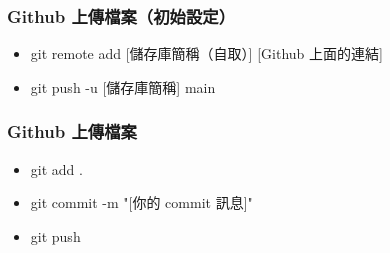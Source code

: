 \documentclass[mathserif]{beamer}
\begin{document}
\begin{frame}
    \frametitle{Github 上傳檔案（初始設定）}
    \begin{itemize}
        \item {\color{red}git remote add [儲存庫簡稱（自取）] [Github 上面的連結]}
        \item {\color{red}git push -u [儲存庫簡稱] main}
    \end{itemize}
\end{frame}

\begin{frame}
    \frametitle{Github 上傳檔案}
    \begin{itemize}
        \item {\color{red}git add .}
        \item {\color{red}git commit -m "[你的 commit 訊息]"}
        \item {\color{red}git push}
    \end{itemize}
\end{frame}
\end{document}
